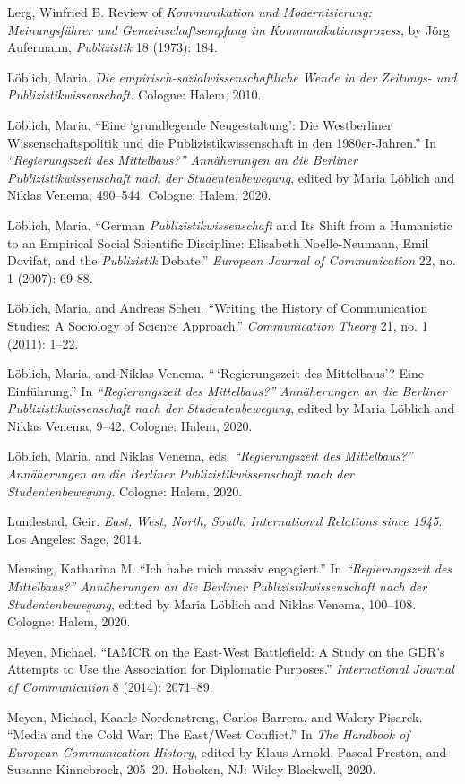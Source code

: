 \documentclass{tufte-handout}
\begin{document}
\begin{hangparas}{.25in}{1}
Lerg, Winfried B. Review of \emph{Kommunikation und Modernisierung:
Meinungsführer und Gemeinschaftsempfang im Kommunikationsprozess}, by
Jörg Aufermann, \emph{Publizistik} 18 (1973): 184.

Löblich, Maria. \emph{Die empirisch-sozialwissenschaftliche Wende in der
Zeitungs- und Publizistikwissenschaft.} Cologne: Halem, 2010.

Löblich, Maria. ``Eine `grundlegende Neugestaltung': Die Westberliner
Wissenschaftspolitik und die Publizistikwissenschaft in den
1980er-Jahren.'' In \emph{``Regierungszeit des Mittelbaus?''
Annäherungen an die Berliner Publizistikwissenschaft nach der
Studentenbewegung}, edited by Maria Löblich and Niklas Venema, 490--544.
Cologne: Halem, 2020.

Löblich, Maria. ``German \emph{Publizistikwissenschaft} and Its Shift
from a Humanistic to an Empirical Social Scientific Discipline:
Elisabeth Noelle-Neumann, Emil Dovifat, and the \emph{Publizistik}
Debate.'' \emph{European Journal of Communication} 22, no. 1 (2007):
69-88.

Löblich, Maria, and Andreas Scheu. ``Writing the History of
Communication Studies: A Sociology of Science Approach.''
\emph{Communication Theory} 21, no. 1 (2011): 1--22.

Löblich, Maria, and Niklas Venema. ``\,`Regierungszeit des Mittelbaus'?
Eine Einführung.'' In \emph{``Regierungszeit des Mittelbaus?''
Annäherungen an die Berliner Publizistikwissenschaft nach der
Studentenbewegung}, edited by Maria Löblich and Niklas Venema, 9--42.
Cologne: Halem, 2020.

Löblich, Maria, and Niklas Venema, eds. \emph{``Regierungszeit des
Mittelbaus?'' Annäherungen an die Berliner Publizistikwissenschaft nach
der Studentenbewegung.} Cologne: Halem, 2020.

Lundestad, Geir. \emph{East, West, North, South: International Relations
since 1945}. Los Angeles: Sage, 2014.

Mensing, Katharina M. ``Ich habe mich massiv engagiert.'' In
\emph{``Regierungszeit des Mittelbaus?'' Annäherungen an die Berliner
Publizistikwissenschaft nach der Studentenbewegung}, edited by Maria
Löblich and Niklas Venema, 100--108. Cologne: Halem, 2020.

Meyen, Michael. ``IAMCR on the East-West Battlefield: A Study on the
GDR's Attempts to Use the Association for Diplomatic Purposes.''
\emph{International Journal of Communication} 8 (2014): 2071--89.

Meyen, Michael, Kaarle Nordenstreng, Carlos Barrera, and Walery Pisarek.
``Media and the Cold War: The East/West Conflict.'' In \emph{The
Handbook of European Communication History}, edited by Klaus Arnold,
Pascal Preston, and Susanne Kinnebrock, 205--20. Hoboken, NJ:
Wiley-Blackwell, 2020.


\end{hangparas}
\end{document}
